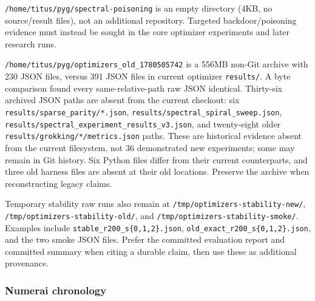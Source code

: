 \documentclass[
  british,
  10pt,
  a4paper,
]{article}
\begin{document}
\texttt{/\allowbreak{}home/\allowbreak{}titus/\allowbreak{}pyg/\allowbreak{}spectral-\allowbreak{}poisoning}
is an empty directory (4KB, no source/\allowbreak{}result files), not an
additional repository.\allowbreak{} Targeted
backdoor/\allowbreak{}poisoning evidence must instead be sought in the
core optimizer experiments and later research runs.

\texttt{/\allowbreak{}home/\allowbreak{}titus/\allowbreak{}pyg/\allowbreak{}optimizers\_\allowbreak{}old\_\allowbreak{}1780505742}
is a 556MB non-Git archive with 230 JSON files, versus 391 JSON files in
current optimizer \texttt{results/}. A byte comparison found every
same-\allowbreak{}relative-\allowbreak{}path raw JSON identical.
Thirty-six archived JSON paths are absent from the current checkout: six
\texttt{results/\allowbreak{}sparse\_\allowbreak{}parity/\allowbreak{}*.\allowbreak{}json},
\texttt{results/\allowbreak{}spectral\_\allowbreak{}spiral\_\allowbreak{}sweep.\allowbreak{}json},
\texttt{results/\allowbreak{}spectral\_\allowbreak{}experiment\_\allowbreak{}results\_\allowbreak{}v3.\allowbreak{}json},
and twenty-\allowbreak{}eight older
\texttt{results/\allowbreak{}grokking/\allowbreak{}*/\allowbreak{}metrics.\allowbreak{}json}
paths. These are historical evidence absent from the current
filesystem,\allowbreak{} not 36 demonstrated new experiments; some may
remain in Git history. Six Python files differ from their current
counterparts\allowbreak{},\allowbreak{} and three old harness files are
absent at their old locations. Preserve the archive when reconstructing
legacy claims.

Temporary stability raw runs also remain at
\texttt{/\allowbreak{}tmp/\allowbreak{}optimizers-\allowbreak{}stability-\allowbreak{}new/\allowbreak{}},
\texttt{/\allowbreak{}tmp/\allowbreak{}optimizers-\allowbreak{}stability-\allowbreak{}old/\allowbreak{}},
and
\texttt{/\allowbreak{}tmp/\allowbreak{}optimizers-\allowbreak{}stability-\allowbreak{}smoke/\allowbreak{}}.
Examples include
\texttt{stable\_\allowbreak{}r200\_\allowbreak{}s\{\allowbreak{}0,\allowbreak{}1,\allowbreak{}2\}\allowbreak{}.\allowbreak{}json},
\texttt{old\_\allowbreak{}exact\_\allowbreak{}r200\_\allowbreak{}s\{\allowbreak{}0,\allowbreak{}1,\allowbreak{}2\}\allowbreak{}.\allowbreak{}json},
and the two smoke JSON files. Prefer the committed evaluation report and
committed summary when citing a durable claim, then use these as
additional provenance.\allowbreak{}

\subsubsection{Numerai
chronology}\label{repository-inventory--numerai-chronology}
\end{document}
